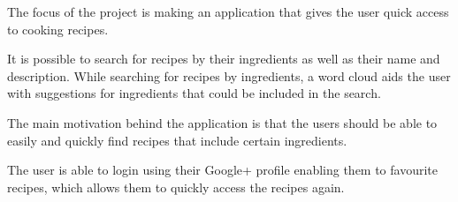 The focus of the project is making an application that gives the user quick access to cooking recipes.

It is possible to search for recipes by their ingredients as well as their name and description. While searching for recipes by ingredients, a word cloud aids the user with suggestions for ingredients that could be included in the search.

The main motivation behind the application is that the users should be able to easily and quickly find recipes that include certain ingredients.

The user is able to login using their Google+ profile enabling them to favourite recipes, which allows them to quickly access the recipes again.

